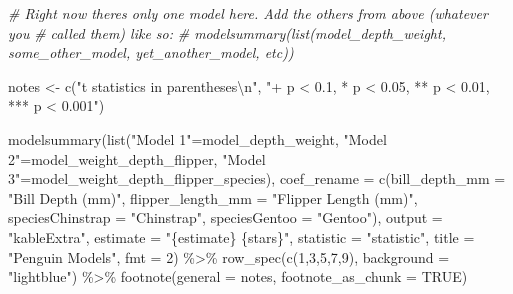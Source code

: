 \documentclass[
]{article}
\newenvironment{Shaded}{\begin{snugshade}}{\end{snugshade}}
\newcommand{\AttributeTok}[1]{\textcolor[rgb]{0.77,0.63,0.00}{#1}}
\newcommand{\CommentTok}[1]{\textcolor[rgb]{0.56,0.35,0.01}{\textit{#1}}}
\newcommand{\ConstantTok}[1]{\textcolor[rgb]{0.00,0.00,0.00}{#1}}
\newcommand{\DecValTok}[1]{\textcolor[rgb]{0.00,0.00,0.81}{#1}}
\newcommand{\FunctionTok}[1]{\textcolor[rgb]{0.00,0.00,0.00}{#1}}
\newcommand{\NormalTok}[1]{#1}
\newcommand{\OtherTok}[1]{\textcolor[rgb]{0.56,0.35,0.01}{#1}}
\newcommand{\SpecialCharTok}[1]{\textcolor[rgb]{0.00,0.00,0.00}{#1}}
\newcommand{\StringTok}[1]{\textcolor[rgb]{0.31,0.60,0.02}{#1}}
\begin{document}
\begin{Shaded}
\begin{Highlighting}[]
\CommentTok{\# Right now there\textquotesingle{}s only one model here. Add the others from above (whatever you}
\CommentTok{\# called them) like so: }
\CommentTok{\# modelsummary(list(model\_depth\_weight, some\_other\_model, yet\_another\_model, etc))}


\NormalTok{notes }\OtherTok{\textless{}{-}} \FunctionTok{c}\NormalTok{(}\StringTok{"t statistics in parentheses}\SpecialCharTok{\textbackslash{}n}\StringTok{"}\NormalTok{,}
           \StringTok{"+ p \textless{} 0.1, * p \textless{} 0.05, ** p \textless{} 0.01, *** p \textless{} 0.001"}\NormalTok{)}

\FunctionTok{modelsummary}\NormalTok{(}\FunctionTok{list}\NormalTok{(}\StringTok{"Model 1"}\OtherTok{=}\NormalTok{model\_depth\_weight, }
                  \StringTok{"Model 2"}\OtherTok{=}\NormalTok{model\_weight\_depth\_flipper, }
                  \StringTok{"Model 3"}\OtherTok{=}\NormalTok{model\_weight\_depth\_flipper\_species),}
             \AttributeTok{coef\_rename =} \FunctionTok{c}\NormalTok{(}\AttributeTok{bill\_depth\_mm =} \StringTok{"Bill Depth (mm)"}\NormalTok{, }
                             \AttributeTok{flipper\_length\_mm =} \StringTok{"Flipper Length (mm)"}\NormalTok{, }
                             \AttributeTok{speciesChinstrap =} \StringTok{"Chinstrap"}\NormalTok{, }
                             \AttributeTok{speciesGentoo =} \StringTok{"Gentoo"}\NormalTok{),}
             \AttributeTok{output =} \StringTok{"kableExtra"}\NormalTok{,}
             \AttributeTok{estimate =} \StringTok{"\{estimate\} \{stars\}"}\NormalTok{,}
             \AttributeTok{statistic =} \StringTok{"statistic"}\NormalTok{,}
             \AttributeTok{title =} \StringTok{"Penguin Models"}\NormalTok{,}
             \AttributeTok{fmt =}  \DecValTok{2}\NormalTok{) }\SpecialCharTok{\%\textgreater{}\%} 
  \FunctionTok{row\_spec}\NormalTok{(}\FunctionTok{c}\NormalTok{(}\DecValTok{1}\NormalTok{,}\DecValTok{3}\NormalTok{,}\DecValTok{5}\NormalTok{,}\DecValTok{7}\NormalTok{,}\DecValTok{9}\NormalTok{), }\AttributeTok{background =} \StringTok{"lightblue"}\NormalTok{) }\SpecialCharTok{\%\textgreater{}\%} 
  \FunctionTok{footnote}\NormalTok{(}\AttributeTok{general =}\NormalTok{ notes, }\AttributeTok{footnote\_as\_chunk =} \ConstantTok{TRUE}\NormalTok{)}
\end{Highlighting}
\end{Shaded}
\end{document}
